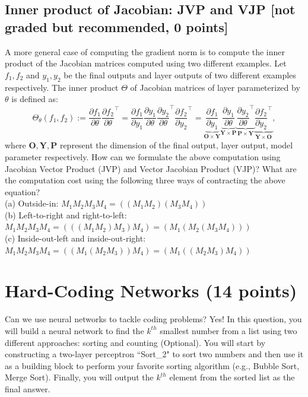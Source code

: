 \documentclass[11pt]{article}
\begin{document}
\subsection{Inner product of Jacobian: JVP and VJP {[not graded but recommended, 0 points]}}
A more general case of computing the gradient norm is to compute the inner product of the Jacobian matrices computed using two different examples. Let $f_1, f_2$ and $y_1, y_2$ be the final outputs and layer outputs of two different examples respectively. The inner product $\Theta$ of Jacobian matrices of layer parameterized by $\theta$ is defined as:
$$
\Theta_{\theta}\left(f_{1}, f_{2}\right):=\frac{\partial f_{1}}{\partial \theta} \frac{\partial f_{2}}{\partial \theta}^{\top}=\frac{\partial f_{1}}{\partial y_{1}} \frac{\partial y_{1}}{\partial \theta} \frac{\partial y_{2}}{\partial \theta}^{\top} \frac{\partial f_{2}}{\partial y_{2}}^{\top}= \underbrace{\frac{\partial f_{1}}{\partial y_{1}}}_{\mathbf{O} \times \mathbf{Y}} \underbrace{\frac{\partial y_{1}}{\partial \theta}}_{\mathbf{Y} \times \mathbf{P}} \underbrace{\frac{\partial y_{2}}{\partial \theta}^{\top}}_{\mathbf{P} \times \mathbf{Y}} \underbrace{\frac{\partial f_{2}}{\partial y_{2}}^{\top}}_{\mathbf{Y} \times \mathbf{O}},
$$
where $\mathbf{O}, \mathbf{Y}, \mathbf{P}$ represent the dimension of the final output, layer output, model parameter respectively. 
How can we formulate the above computation using Jacobian Vector Product (JVP) and Vector Jacobian Product (VJP)? What are the computation cost using the following three ways of contracting the above equation? \\

\noindent (a) Outside-in: $M_1M_2M_3M_4 = ((M_1M_2)(M_3M_4))$  \\
(b) Left-to-right and right-to-left: $M_1M_2M_3M_4=(((M_1M_2)M_3)M_4)=(M_1(M_2(M_3M_4)))$  \\
(c) Inside-out-left and inside-out-right: $M_1M_2M_3M_4 = ((M_1(M_2M_3))M_4) = (M_1((M_2M_3)M_4))$     


\section{Hard-Coding Networks (14 points)}
 
    Can we use neural networks to tackle coding problems? Yes! In this question, you will build a neural network to find the $k^{th}$ smallest number from a list using two different approaches: sorting and counting (Optional). You will start by constructing a two-layer perceptron ``Sort\_2" to sort two numbers and then use it as a building block to perform your favorite sorting algorithm (e.g., Bubble Sort, Merge Sort). Finally, you will output the $k^{th}$ element from the sorted list as the final answer. \\
    
\end{document}
